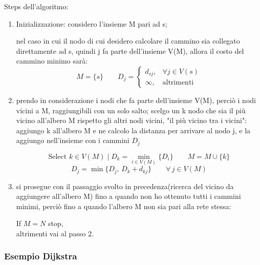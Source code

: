 Steps dell'algoritmo:
\begin{enumerate}
    \item Inizializzazione: considero l'insieme M pari ad s; 
    


    nel caso in cui il nodo di cui desidero calcolare il cammino sia collegato direttamente ad s, quindi j fa parte dell'insieme V(M), allora il costo del cammino minimo sarà:
    \[
    M = \{s\} \qquad
    D_j = 
    \begin{cases}
        d_{sj}, & \forall j \in V(s) \\
        \infty, & \text{altrimenti}
    \end{cases}
    \]
    \item prendo in considerazione i nodi che fa parte dell'insieme V(M), perciò i nodi vicini a M, raggiungibili con un solo salto;
   scelgo un k nodo che sia il più vicino all'albero M rispetto gli altri nodi vicini, "il più vicino tra i vicini": aggiungo k all'albero M e ne calcolo la distanza per arrivare al nodo j, e la aggiungo nell'insieme con i cammini $D_j$

\[
\text{Select } k \in V(M) \mid D_k = \min_{i \in V(M)} \{ D_i \}  \qquad   M = M \cup \{ k \}  
\]
\[
D_j = \min \{ D_j,\, D_k + d_{kj} \} \qquad \forall\, j \in V(M)
\]
    
   \item si prosegue con il passaggio svolto in precedenza(ricerca del vicino da aggiungere all'albero M) fino a quando non ho ottenuto tutti i cammini minimi, perciò fino a quando l'albero M non sia pari alla rete stessa:
    
If $M = N$ stop,\\
altrimenti vai al passo 2.
\end{enumerate}

\subsubsection{Esempio Dijkstra}

